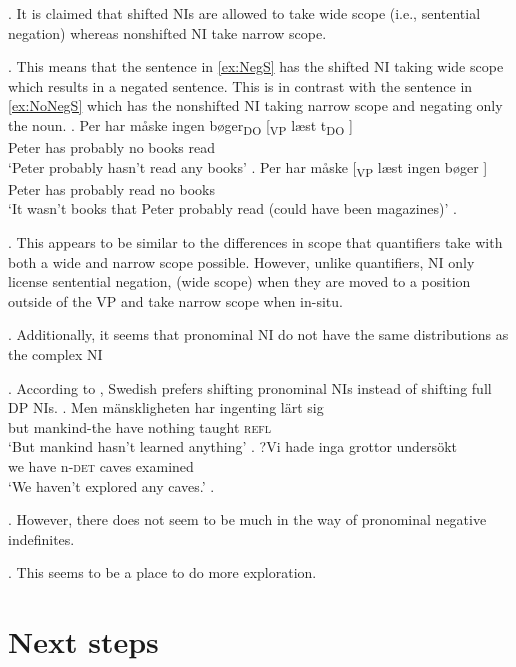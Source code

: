 \documentclass[12pt, letterpaper]{article}
\begin{document}
\ex. It is claimed that shifted NIs are allowed to take wide scope (i.e., sentential negation) whereas nonshifted NI take narrow scope.

\ex. This means that the sentence in \ref{ex:NegS} has the shifted NI taking wide scope which results in a negated sentence. This is in contrast with the sentence in \ref{ex:NoNegS} which has the nonshifted NI taking narrow scope and negating only the noun.
	\ag. Per har måske ingen bøger\textsubscript{DO} [\textsubscript{VP} læst t\textsubscript{DO} ] \label{ex:NegS} \\
	Peter has probably no books {} read\\
	`Peter probably hasn't read any books'
	\bg. Per har måske [\textsubscript{VP} læst ingen bøger ]\label{ex:NoNegS} \\
	Peter has probably {} read no books\\
	`It wasn't books that Peter probably read (could have been magazines)'
	\z.
	
\ex. This appears to be similar to the differences in scope that quantifiers take with both a wide and narrow scope possible. However, unlike quantifiers, NI only license sentential negation, (wide scope) when they are moved to a position outside of the VP and take narrow scope when in-situ.

\ex. Additionally, it seems that pronominal NI do not have the same distributions as the complex NI \citep{penkaNegativeIndefinites2011}

\ex. According to \citet{penkaNegativeIndefinites2011}, Swedish prefers shifting pronominal NIs instead of shifting full DP NIs.
	\ag. Men mänskligheten har ingenting lärt sig\\
		but mankind-the have nothing taught \textsc{refl}\\
		`But mankind hasn't learned anything'
	\bg. ?Vi hade inga grottor undersökt\\
	we have n-\textsc{det} caves examined\\
	`We haven't explored any caves.'
	\z.
	
\ex. However, there does not seem to be much in the way of pronominal negative indefinites. 

\ex. This seems to be a place to do more exploration.

\section{Next steps}
\end{document}
